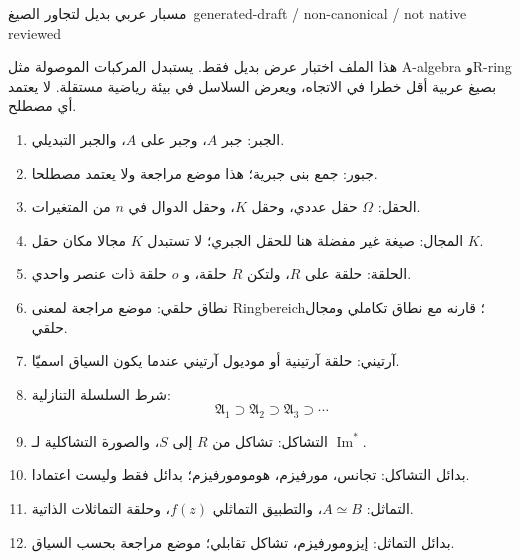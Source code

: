 \documentclass[12pt]{article}
\begin{document}
\begin{center}
{\Large مسبار عربي بديل لتجاور الصيغ}\
{\small \textenglish{generated-draft / non-canonical / not native reviewed}}
\end{center}

هذا الملف اختبار عرض بديل فقط. يستبدل المركبات الموصولة مثل \textenglish{A-algebra} و\textenglish{R-ring} بصيغ عربية أقل خطرا في الاتجاه، ويعرض السلاسل في بيئة رياضية مستقلة. لا يعتمد أي مصطلح.

\begin{enumerate}
\item الجبر: جبر \(A\)، وجبر على \(A\)، والجبر التبديلي.
\item جبور: جمع بنى جبرية؛ هذا موضع مراجعة ولا يعتمد مصطلحا.
\item الحقل: \(\Omega\) حقل عددي، وحقل \(K\)، وحقل الدوال في \(n\) من المتغيرات.
\item المجال: صيغة غير مفضلة هنا للحقل الجبري؛ لا تستبدل \(K\) مجالا مكان حقل \(K\).
\item الحلقة: حلقة على \(R\)، ولتكن \(R\) حلقة، و \(o\) حلقة ذات عنصر واحدي.
\item نطاق حلقي: موضع مراجعة لمعنى \textenglish{Ringbereich}؛ قارنه مع نطاق تكاملي ومجال حلقي.
\item آرتيني: حلقة آرتينية أو موديول آرتيني عندما يكون السياق اسميّا.
\item شرط السلسلة التنازلية:
\[
\mathfrak A_1 \supset \mathfrak A_2 \supset \mathfrak A_3 \supset \cdots
\]
\item التشاكل: تشاكل من \(R\) إلى \(S\)، والصورة التشاكلية لـ \(\operatorname{Im}^*\).
\item بدائل التشاكل: تجانس، مورفيزم، هومومورفيزم؛ بدائل فقط وليست اعتمادا.
\item التماثل: \(A\simeq B\)، والتطبيق التماثلي \(f(z)\)، وحلقة التماثلات الذاتية.
\item بدائل التماثل: إيزومورفيزم، تشاكل تقابلي؛ موضع مراجعة بحسب السياق.
\end{enumerate}
\end{document}
